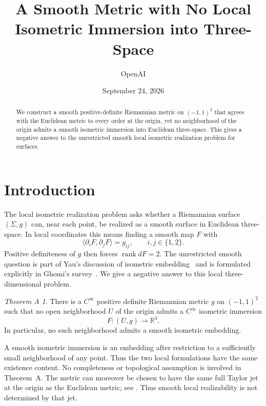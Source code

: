 \documentclass[11pt]{amsart}
\title[A smooth metric with no local isometric immersion]{A Smooth Metric with No Local Isometric Immersion into Three-Space}
\author{OpenAI}
\date{September 24, 2026}
\theoremstyle{definition}
\theoremstyle{remark}
\newtheorem*{maintheorem}{Theorem A}
\numberwithin{equation}{section}
\newcommand{\R}{\mathbb R}
\begin{document}
\begin{abstract}
We construct a smooth positive-definite Riemannian metric on
\((-1,1)^2\) that agrees with the Euclidean metric to every order at
the origin, yet no neighborhood of the origin admits a smooth
isometric immersion into Euclidean three-space. This gives a negative
answer to the unrestricted smooth local isometric realization problem
for surfaces.
\end{abstract}
\maketitle

\section{Introduction}

The local isometric realization problem asks whether a Riemannian
surface \((\Sigma,g)\) can, near each point, be realized as a smooth
surface in Euclidean three-space. In local coordinates this means
finding a smooth map \(F\) with
\[
\langle \partial_iF,\partial_jF\rangle=g_{ij},
\qquad i,j\in\{1,2\}.
\]
Positive definiteness of \(g\) then forces \(\operatorname{rank}dF=2\).
The unrestricted smooth question is part of Yau's discussion of
isometric embedding~\cite[p.~236]{Yau2000} and is formulated explicitly
in Ghomi's survey~\cite[Section~1.5, Problem~1.9]{Ghomi2019}.
We give a negative answer to this local three-dimensional problem.

\begin{maintheorem}
There is a \(C^\infty\) positive definite Riemannian metric \(g\) on
\((-1,1)^2\) such that no open neighborhood \(U\) of the origin admits a
\(C^\infty\) isometric immersion
\[
F:(U,g)\longrightarrow\R^3.
\]
In particular, no such neighborhood admits a smooth isometric embedding.
\end{maintheorem}

A smooth isometric immersion is an embedding after restriction to a
sufficiently small neighborhood of any point. Thus the two local
formulations have the same existence content. No completeness or
topological assumption is involved in Theorem~A.
The metric can moreover be chosen to have the same full Taylor jet
at the origin as the Euclidean metric; see .
Thus smooth local realizability is not determined by that jet.
\end{document}
